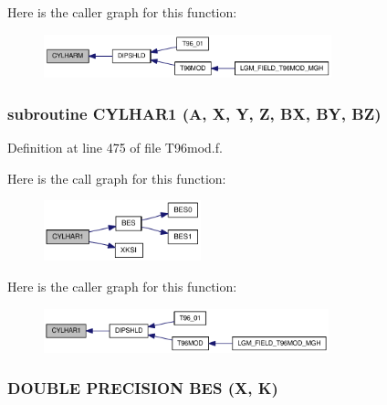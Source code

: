 Here is the caller graph for this function:\nopagebreak
\begin{figure}[H]
\begin{center}
\leavevmode
\includegraphics[width=236pt]{_t96mod_8f_a1021262eae38287e65bc7ff696f67a2_icgraph}
\end{center}
\end{figure}
\hypertarget{_t96mod_8f_79feb4cb40c2a7d62058e92afda49cf6}{
\subsubsection[{CYLHAR1}]{\setlength{\rightskip}{0pt plus 5cm}subroutine CYLHAR1 (A, \/  X, \/  Y, \/  Z, \/  BX, \/  BY, \/  BZ)}}
\label{_t96mod_8f_79feb4cb40c2a7d62058e92afda49cf6}




Definition at line 475 of file T96mod.f.

Here is the call graph for this function:\nopagebreak
\begin{figure}[H]
\begin{center}
\leavevmode
\includegraphics[width=129pt]{_t96mod_8f_79feb4cb40c2a7d62058e92afda49cf6_cgraph}
\end{center}
\end{figure}


Here is the caller graph for this function:\nopagebreak
\begin{figure}[H]
\begin{center}
\leavevmode
\includegraphics[width=234pt]{_t96mod_8f_79feb4cb40c2a7d62058e92afda49cf6_icgraph}
\end{center}
\end{figure}
\hypertarget{_t96mod_8f_273ee53e86263995858fc8c0a702433a}{
\subsubsection[{BES}]{\setlength{\rightskip}{0pt plus 5cm}DOUBLE PRECISION BES (X, \/  K)}}
\label{_t96mod_8f_273ee53e86263995858fc8c0a702433a}





